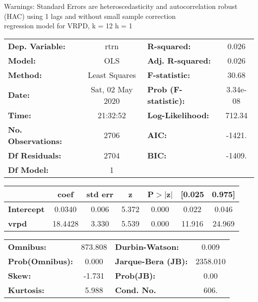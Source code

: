 Warnings: \newline
 [1] Standard Errors are heteroscedasticity and autocorrelation robust (HAC) using 1 lags and without small sample correction\\ 

regression model for VRPD, k = 12 h = 1\begin{center}
\begin{tabular}{lclc}
\toprule
\textbf{Dep. Variable:}    &       rtrn       & \textbf{  R-squared:         } &     0.026   \\
\textbf{Model:}            &       OLS        & \textbf{  Adj. R-squared:    } &     0.026   \\
\textbf{Method:}           &  Least Squares   & \textbf{  F-statistic:       } &     30.68   \\
\textbf{Date:}             & Sat, 02 May 2020 & \textbf{  Prob (F-statistic):} &  3.34e-08   \\
\textbf{Time:}             &     21:32:52     & \textbf{  Log-Likelihood:    } &    712.34   \\
\textbf{No. Observations:} &        2706      & \textbf{  AIC:               } &    -1421.   \\
\textbf{Df Residuals:}     &        2704      & \textbf{  BIC:               } &    -1409.   \\
\textbf{Df Model:}         &           1      & \textbf{                     } &             \\
\bottomrule
\end{tabular}
\begin{tabular}{lcccccc}
                   & \textbf{coef} & \textbf{std err} & \textbf{z} & \textbf{P$> |$z$|$} & \textbf{[0.025} & \textbf{0.975]}  \\
\midrule
\textbf{Intercept} &       0.0340  &        0.006     &     5.372  &         0.000        &        0.022    &        0.046     \\
\textbf{vrpd}      &      18.4428  &        3.330     &     5.539  &         0.000        &       11.916    &       24.969     \\
\bottomrule
\end{tabular}
\begin{tabular}{lclc}
\textbf{Omnibus:}       & 873.808 & \textbf{  Durbin-Watson:     } &    0.009  \\
\textbf{Prob(Omnibus):} &   0.000 & \textbf{  Jarque-Bera (JB):  } & 2358.010  \\
\textbf{Skew:}          &  -1.731 & \textbf{  Prob(JB):          } &     0.00  \\
\textbf{Kurtosis:}      &   5.988 & \textbf{  Cond. No.          } &     606.  \\
\bottomrule
\end{tabular}
\end{center}

